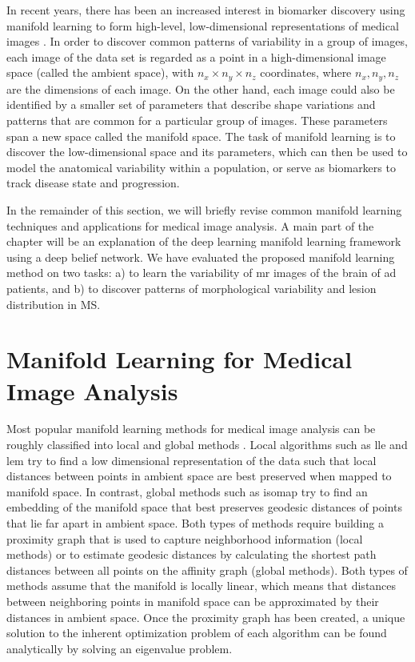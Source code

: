 In recent years, there has been an increased interest in biomarker discovery
using manifold learning to form high-level, low-dimensional representations of
medical images \citep{wolz2010b,aljabar2011,wolz2012}. In order to discover
common patterns of variability in a group of images, each image of the data set
is regarded as a point in a high-dimensional image space (called the ambient
space), with $n_x \times n_y \times n_z$ coordinates, where $n_x, n_y, n_z$ are
the dimensions of each image. On the other hand, each image could also be
identified by a smaller set of parameters that describe shape variations and
patterns that are common for a particular group of images. These parameters span
a new space called the manifold space. The task of manifold learning is to
discover the low-dimensional space and its parameters, which can then be used to
model the anatomical variability within a population, or serve as biomarkers to
track disease state and progression.

In the remainder of this section, we will briefly revise common manifold
learning techniques and applications for medical image analysis. A main part of
the chapter will be an explanation of the deep learning manifold learning
framework using a deep belief network. We have evaluated the proposed manifold
learning method on two tasks: a) to learn the variability of \gls{mr} images of
the brain of \gls{ad} patients, and b) to discover patterns of morphological
variability and lesion distribution in MS.

\section[Manifold learning for medical image analysis]{Manifold Learning for
Medical Image Analysis}

Most popular manifold learning methods for medical image analysis can be roughly
classified into local and global methods \citep{cayton2005}. Local algorithms
such as \gls{lle} \citep{saul2003} and \gls{lem} \citep{belkin2002} try to find a low
dimensional representation of the data such that local distances between points
in ambient space are best preserved when mapped to manifold space. In contrast,
global methods such as \gls{isomap} \citep{tenenbaum2000} try to find an
embedding of the manifold space that best preserves geodesic distances of points
that lie far apart in ambient space. Both types of methods require building a
proximity graph that is used to capture neighborhood information (local methods)
or to estimate geodesic distances by calculating the shortest path distances
between all points on the affinity graph (global methods). Both types of methods
assume that the manifold is locally linear, which means that distances between
neighboring points in manifold space can be approximated by their distances in
ambient space. Once the proximity graph has been created, a unique solution to
the inherent optimization problem of each algorithm can be found analytically by
solving an eigenvalue problem.

